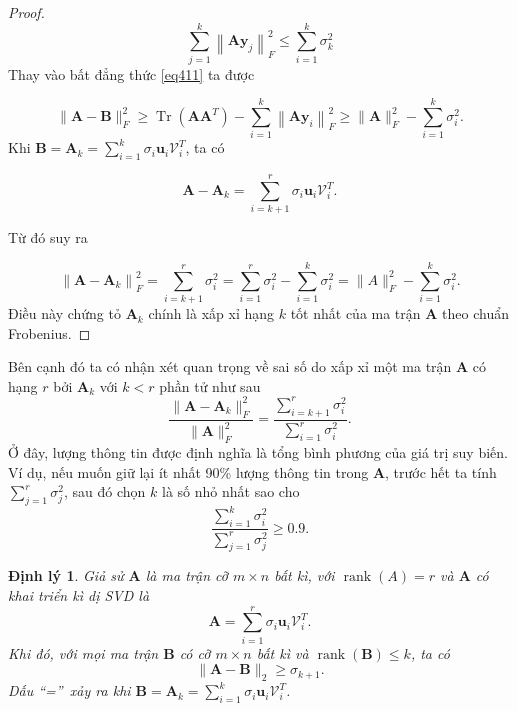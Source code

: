 \documentclass[12pt,a4paper,oneside]{report}
\newtheorem{dl}{Định lý}[section]
\numberwithin{equation}{section}
\begin{document}
\begin{proof}
$$
\sum_{j=1}^{k}\left\|\mathbf{A y}_{j}\right\|_{F}^{2} \leqslant \sum_{i=1}^{k} \sigma_{k}^{2}
$$
Thay vào bất đẳng thức \ref{eq411} ta được

$$
\|\mathbf{A}-\mathbf{B}\|_{F}^{2} \geqslant \operatorname{Tr}\left(\mathbf{A} \mathbf{A}^{T}\right)-\sum_{i=1}^{k}\left\|\mathbf{A} \mathbf{y}_{i}\right\|_{F}^{2} \geqslant\|\mathbf{A}\|_{F}^{2}-\sum_{i=1}^{k} \sigma_{i}^{2} .
$$
Khi $\mathbf{B}=\mathbf{A}_{k}=\sum_{i=1}^{k} \sigma_{i} \mathbf{u}_{i} \mathcal{V}_{i}^{T}$, ta có

$$
\mathbf{A}-\mathbf{A}_{k}=\sum_{i=k+1}^{r} \sigma_{i} \mathbf{u}_{i} \mathcal{V}_{i}^{T} .
$$

Từ đó suy ra

$$
\left\|\mathbf{A}-\mathbf{A}_{k}\right\|_{F}^{2}=\sum_{i=k+1}^{r} \sigma_{i}^{2}=\sum_{i=1}^{r} \sigma_{i}^{2}-\sum_{i=1}^{k} \sigma_{i}^{2}=\|A\|_{F}^{2}-\sum_{i=1}^{k} \sigma_{i}^{2} .
$$
Điều này chứng tỏ $\mathbf{A}_{k}$ chính là xấp xỉ hạng $k$ tốt nhất của ma trận $\mathbf{A}$ theo chuẩn Frobenius.
\end{proof}
Bên cạnh đó ta có nhận xét quan trọng về sai số do xấp xỉ một ma trận $\mathbf{A}$ có hạng $r$ bởi $\mathbf{A}_{k}$ với $k < r$ phần tử như sau
$$
	\label{eqn:26_17}
	\frac{\|\mathbf{A} - \mathbf{A}_k\|_F^2}{\|\mathbf{A}\|_F^2} = {\frac{\sum_{i=k+1}^{r} \sigma_{i}^{2}}{\sum_{i=1}^{r} \sigma_{i}^{2}}} .
$$
Ở đây, {lượng thông tin} được định nghĩa
là tổng bình phương của giá trị suy biến. Ví dụ, nếu muốn giữ lại ít nhất
90\% lượng thông tin trong $\mathbf{A}$, trước hết ta tính $\sum_{j = 1}^r
\sigma_j^2$, sau đó chọn $k$ là số nhỏ nhất sao cho
$$
	\frac{\sum_{i = 1}^k \sigma_i^2}{\sum_{j = 1}^r \sigma_j^2} \geq 0.9 .
$$

\begin{dl} \cite{linh2016} Giả sử $\mathbf{A}$ là ma trận cỡ $m \times n$ bất kì, với $\operatorname{rank}(A)=r$ và $\mathbf{A}$ có khai triển kì dị SVD là
$$
\mathbf{A}=\sum_{i=1}^{r} \sigma_{i} \mathbf{u}_{i} \mathcal{V}_{i}^{T} .
$$
Khi đó, với mọi ma trận $\mathbf{B}$ có cỡ $m \times n$ bất kì và $\operatorname{rank}(\mathbf{B}) \leqslant k$, ta có
$$
\|\mathbf{A}-\mathbf{B}\|_{2} \geqslant \sigma_{k+1} .
$$
Dấu \textquotedblleft  =\textquotedblright\ xảy ra khi $\mathbf{B}=\mathbf{A}_{k}=\sum_{i=1}^{k} \sigma_{i} \mathbf{u}_{i} \mathcal{V}_{i}^{T}$.
\end{dl}
\end{document}
